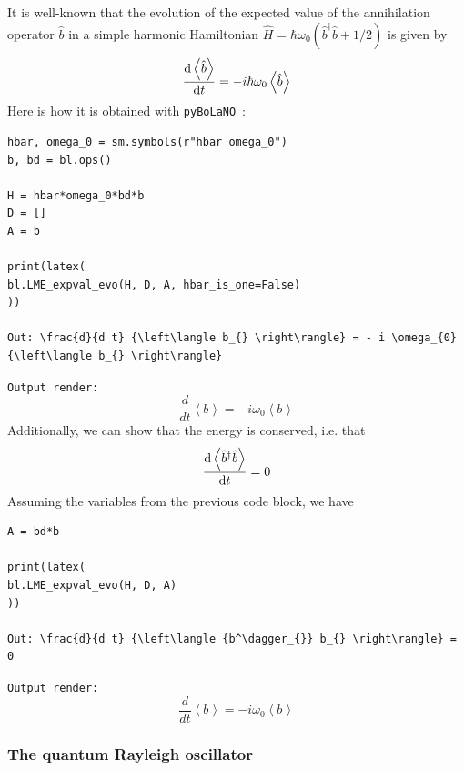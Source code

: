 \documentclass[onecolumn, 12pt, sort&compress]{elsarticle}
\newcommand{\inlinecode}[1]{\texttt{#1}}
\newcommand{\expval}[1]{\left\langle{#1}\right\rangle}
\newcommand{\bop}{\hat{b}}
\newcommand{\bdag}{\bop^\dagger}
\newcommand{\pybolano}{\texttt{pyBoLaNO}~}
\newenvironment{revision2}{%
\color{red}
}
{}
\begin{document}
It is well-known that the evolution of the expected value of the annihilation operator $\bop$ in a simple harmonic Hamiltonian $\hat{H} = \hbar\omega_0\left(\bdag\bop+1/2\right)$ is given by
\begin{equation}
    \odv{\expval{\bop}}{t} = -i\hbar\omega_0\expval{\bop}
\end{equation}
Here is how it is obtained with \pybolano:
\begin{verbatim}
hbar, omega_0 = sm.symbols(r"hbar omega_0")
b, bd = bl.ops()

H = hbar*omega_0*bd*b
D = []
A = b

print(latex(
bl.LME_expval_evo(H, D, A, hbar_is_one=False)
))

Out: \frac{d}{d t} {\left\langle b_{} \right\rangle} = - i \omega_{0} {\left\langle b_{} \right\rangle}
\end{verbatim}
\begin{revision2}
\inlinecode{Output render:}
\begin{equation*}
    \frac{d}{d t} {\left\langle b_{} \right\rangle} = - i \omega_{0} {\left\langle b_{} \right\rangle}
\end{equation*}
\end{revision2}
Additionally, we can show that the energy is conserved, i.e. that
\begin{equation}
    \odv{\expval{\bdag\bop}}{t} = 0
\end{equation}
Assuming the variables from the previous code block, we have
\begin{verbatim}
A = bd*b

print(latex(
bl.LME_expval_evo(H, D, A)
))

Out: \frac{d}{d t} {\left\langle {b^\dagger_{}} b_{} \right\rangle} = 0
\end{verbatim}
\begin{revision2}
\inlinecode{Output render:}
\begin{equation*}
    \frac{d}{d t} {\left\langle b_{} \right\rangle} = - i \omega_{0} {\left\langle b_{} \right\rangle}
\end{equation*}
\end{revision2}

\subsubsection{The quantum Rayleigh oscillator}
\end{document}
